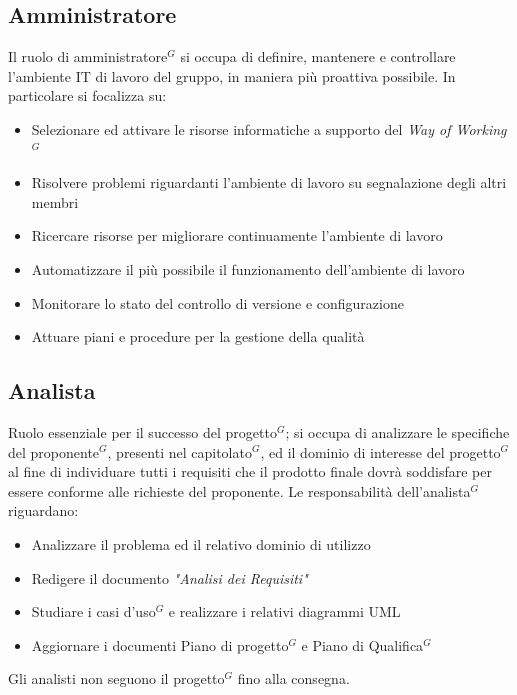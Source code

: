 \documentclass[a4paper,10pt]{article}
\begin{document}
\subsection{Amministratore}
Il ruolo di amministratore$^G$ si occupa di definire, mantenere e controllare l'ambiente IT di lavoro del gruppo, in 
maniera più proattiva possibile. In particolare si focalizza su:
\begin{itemize}
  \item Selezionare ed attivare le risorse informatiche a supporto del \textit{Way of Working$^G$}
  \item Risolvere problemi riguardanti l'ambiente di lavoro su segnalazione degli altri membri
  \item Ricercare risorse per migliorare continuamente l'ambiente di lavoro
  \item Automatizzare il più possibile il funzionamento dell'ambiente di lavoro
  \item Monitorare lo stato del controllo di versione e configurazione 
  \item Attuare piani e procedure per la gestione della qualità
\end{itemize}
\subsection{Analista}
Ruolo essenziale per il successo del progetto$^G$; si occupa di analizzare le specifiche del proponente$^G$, presenti
nel capitolato$^G$, ed il dominio di interesse del progetto$^G$ al fine di individuare tutti i requisiti che il prodotto
finale dovrà soddisfare per essere conforme alle richieste del proponente.
Le responsabilità dell'analista$^G$ riguardano: 
\begin{itemize}
  \item Analizzare il problema ed il relativo dominio di utilizzo
  \item Redigere il documento \textit{"Analisi dei Requisiti"}
  \item Studiare i casi d'uso$^G$ e realizzare i relativi diagrammi UML
  \item Aggiornare i documenti Piano di progetto$^G$ e Piano di Qualifica$^G$
\end{itemize}
Gli analisti non seguono il progetto$^G$ fino alla consegna.
\end{document}
